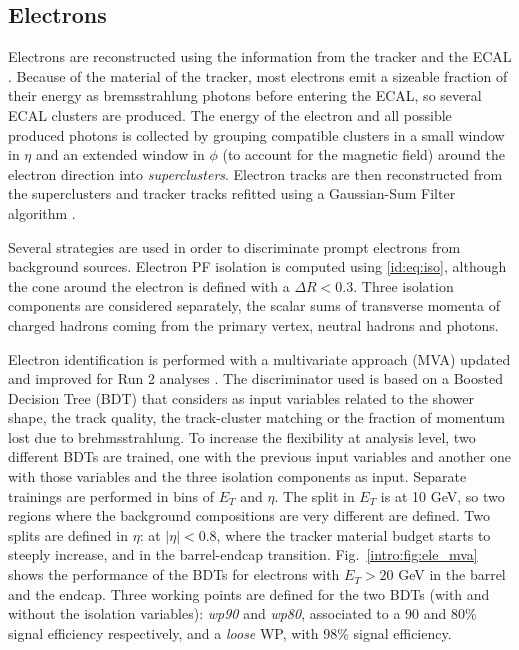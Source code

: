 \documentclass[../main.tex]{subfiles}
\begin{document}
\subsection{Electrons}
\label{intro:subsec:ele}

Electrons are reconstructed using the information from the tracker and the ECAL \cite{intro:id:ele}. Because of the material of the tracker, most electrons emit a sizeable fraction of their energy as bremsstrahlung photons before entering the ECAL, so several ECAL clusters are produced. The energy of the electron and all possible produced photons is collected by grouping compatible clusters in a small window in $\eta$ and an extended window in $\phi$ (to account for the magnetic field) around the electron direction into \textit{superclusters}. Electron tracks are then reconstructed from the superclusters and tracker tracks refitted using a Gaussian-Sum Filter algorithm \cite{intro:id:gsf}.

Several strategies are used in order to discriminate prompt electrons from background sources. Electron PF isolation is computed using \eqref{id:eq:iso}, although the cone around the electron is defined with a $\Delta R < 0.3$. Three isolation components are considered separately, the scalar sums of transverse momenta of charged hadrons coming from the primary vertex, neutral hadrons and photons.

Electron identification is performed with a multivariate approach (MVA) updated and improved for Run 2 analyses \cite{intro:id:ele_mva}. The discriminator used is based on a Boosted Decision Tree (BDT) that considers as input variables related to the shower shape, the track quality, the track-cluster matching or the fraction of momentum lost due to brehmsstrahlung. To increase the flexibility at analysis level, two different BDTs are trained, one with the previous input variables and another one with those variables and the three isolation components as input. Separate trainings are performed in bins of $E_T$ and $\eta$. The split in $E_T$ is at 10 GeV, so two regions where the background compositions are very different are defined. Two splits are defined in $\eta$: at $|\eta|<0.8$, where the tracker material budget starts to steeply increase, and in the barrel-endcap transition. Fig.~\ref{intro:fig:ele_mva} shows the performance of the BDTs for electrons with $E_T > 20$ GeV in the barrel and the endcap. Three working points are defined for the two BDTs (with and without the isolation variables): \textit{wp90} and \textit{wp80}, associated to a 90 and 80\% signal efficiency respectively, and a \textit{loose} WP, with 98\% signal efficiency.
\end{document}
